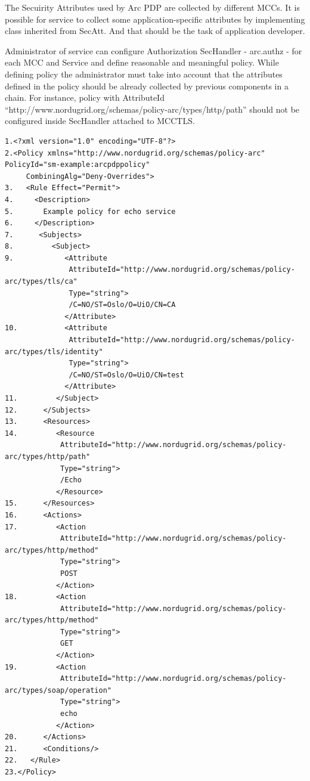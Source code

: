 \documentclass{article}                            %
\begin{document}
The Secuirity Attributes used by Arc PDP are collected by different MCCs. It is possible for service to collect some application-specific attributes by implementing class inherited from SecAtt. And that should be the task of application developer.

Administrator of service can configure Authorization SecHandler - arc.authz - for each MCC and Service and define reasonable and meaningful policy. While defining policy the administrator must take into account that the attributes defined in the policy should be already collected by previous components in a chain. For instance, policy with AttributeId ``http://www.nordugrid.org/schemas/policy-arc/types/http/path'' should not be configured inside SecHandler attached to MCCTLS. 

\begin{verbatim}
1.<?xml version="1.0" encoding="UTF-8"?>
2.<Policy xmlns="http://www.nordugrid.org/schemas/policy-arc" PolicyId="sm-example:arcpdppolicy" 
     CombiningAlg="Deny-Overrides">
3.   <Rule Effect="Permit">
4.     <Description>
5.       Example policy for echo service
6.     </Description>
7.      <Subjects>
8.         <Subject>
9.            <Attribute 
               AttributeId="http://www.nordugrid.org/schemas/policy-arc/types/tls/ca" 
               Type="string">
               /C=NO/ST=Oslo/O=UiO/CN=CA
              </Attribute>
10.           <Attribute 
               AttributeId="http://www.nordugrid.org/schemas/policy-arc/types/tls/identity" 
               Type="string">
               /C=NO/ST=Oslo/O=UiO/CN=test
              </Attribute>
11.         </Subject>
12.      </Subjects>
13.      <Resources>
14.         <Resource 
             AttributeId="http://www.nordugrid.org/schemas/policy-arc/types/http/path" 
             Type="string">
             /Echo
            </Resource>
15.      </Resources>
16.      <Actions>
17.         <Action 
             AttributeId="http://www.nordugrid.org/schemas/policy-arc/types/http/method" 
             Type="string">
             POST
            </Action>
18.         <Action 
             AttributeId="http://www.nordugrid.org/schemas/policy-arc/types/http/method" 
             Type="string">
             GET
            </Action>
19.         <Action 
             AttributeId="http://www.nordugrid.org/schemas/policy-arc/types/soap/operation" 
             Type="string">
             echo
            </Action>
20.      </Actions>
21.      <Conditions/>
22.   </Rule>
23.</Policy>
\end{verbatim}
\end{document}
